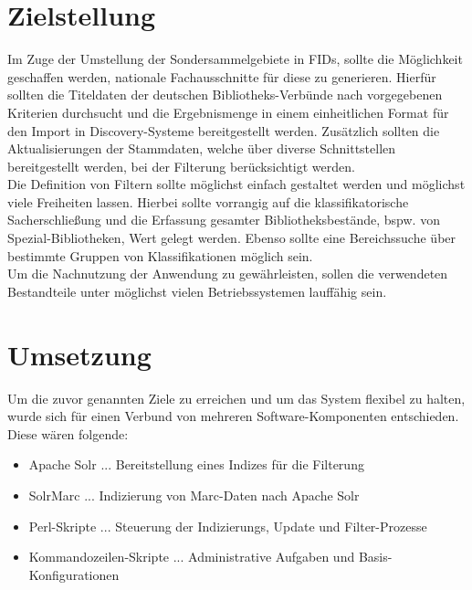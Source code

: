 \documentclass[10pt]{article}
\begin{document}
\section{Zielstellung}
Im Zuge der Umstellung der Sondersammelgebiete in FIDs, sollte die Möglichkeit geschaffen werden, nationale Fachausschnitte für diese zu generieren. Hierfür sollten die Titeldaten der deutschen Bibliotheks-Verbünde nach vorgegebenen Kriterien durchsucht und die Ergebnismenge in einem einheitlichen Format für den Import in Discovery-Systeme bereitgestellt werden. Zusätzlich sollten die Aktualisierungen der Stammdaten, welche über diverse Schnittstellen bereitgestellt werden, bei der Filterung berücksichtigt werden. \\
Die Definition von Filtern sollte möglichst einfach gestaltet werden und möglichst viele Freiheiten lassen. Hierbei sollte vorrangig auf die klassifikatorische Sacherschließung und die Erfassung gesamter Bibliotheksbestände, bspw. von Spezial-Bibliotheken, Wert gelegt werden. Ebenso sollte eine Bereichssuche über bestimmte Gruppen von Klassifikationen möglich sein. \\
Um die Nachnutzung der Anwendung zu gewährleisten, sollen die verwendeten Bestandteile unter möglichst vielen Betriebssystemen lauffähig sein.

\newpage
\section{Umsetzung}
Um die zuvor genannten Ziele zu erreichen und um das System flexibel zu halten, wurde sich für einen Verbund von mehreren Software-Komponenten entschieden. Diese wären folgende:
\begin{itemize}
	\item Apache Solr ... Bereitstellung eines Indizes für die Filterung
	\item SolrMarc ... Indizierung von Marc-Daten nach Apache Solr
	\item Perl-Skripte ... Steuerung der Indizierungs, Update und Filter-Prozesse 
	\item Kommandozeilen-Skripte ... Administrative Aufgaben und Basis-Konfigurationen
\end{itemize}
\end{document}
